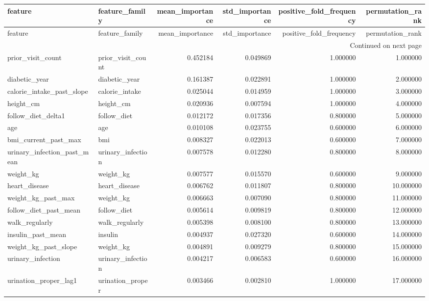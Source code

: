\begin{longtable}{llrrrr}
\toprule
feature & feature\_family & mean\_importance & std\_importance & positive\_fold\_frequency & permutation\_rank \\
\midrule
\endfirsthead
\toprule
feature & feature\_family & mean\_importance & std\_importance & positive\_fold\_frequency & permutation\_rank \\
\midrule
\endhead
\midrule
\multicolumn{6}{r}{Continued on next page} \\
\midrule
\endfoot
\bottomrule
\endlastfoot
prior\_visit\_count & prior\_visit\_count & 0.452184 & 0.049869 & 1.000000 & 1.000000 \\
diabetic\_year & diabetic\_year & 0.161387 & 0.022891 & 1.000000 & 2.000000 \\
calorie\_intake\_past\_slope & calorie\_intake & 0.025044 & 0.014959 & 1.000000 & 3.000000 \\
height\_cm & height\_cm & 0.020936 & 0.007594 & 1.000000 & 4.000000 \\
follow\_diet\_delta1 & follow\_diet & 0.012172 & 0.017356 & 0.800000 & 5.000000 \\
age & age & 0.010108 & 0.023755 & 0.600000 & 6.000000 \\
bmi\_current\_past\_max & bmi & 0.008327 & 0.022013 & 0.600000 & 7.000000 \\
urinary\_infection\_past\_mean & urinary\_infection & 0.007578 & 0.012280 & 0.800000 & 8.000000 \\
weight\_kg & weight\_kg & 0.007577 & 0.015570 & 0.600000 & 9.000000 \\
heart\_disease & heart\_disease & 0.006762 & 0.011807 & 0.800000 & 10.000000 \\
weight\_kg\_past\_max & weight\_kg & 0.006663 & 0.007090 & 0.800000 & 11.000000 \\
follow\_diet\_past\_mean & follow\_diet & 0.005614 & 0.009819 & 0.800000 & 12.000000 \\
walk\_regularly & walk\_regularly & 0.005398 & 0.008100 & 0.800000 & 13.000000 \\
insulin\_past\_mean & insulin & 0.004937 & 0.027320 & 0.600000 & 14.000000 \\
weight\_kg\_past\_slope & weight\_kg & 0.004891 & 0.009279 & 0.800000 & 15.000000 \\
urinary\_infection & urinary\_infection & 0.004217 & 0.006583 & 0.600000 & 16.000000 \\
urination\_proper\_lag1 & urination\_proper & 0.003466 & 0.002810 & 1.000000 & 17.000000 \\

\end{longtable}
